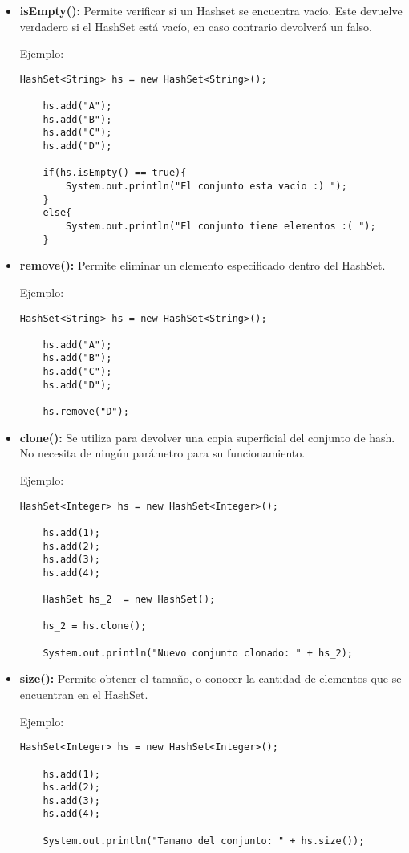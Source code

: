 \documentclass[12pt, letterpaper]{article} %
\begin{document}
\begin{itemize}
    \item \textbf{isEmpty():} Permite verificar si un Hashset se encuentra vacío. Este devuelve verdadero si el HashSet está vacío, en caso contrario devolverá un falso.

    Ejemplo:
    \lstset{language = Java, breaklines=true, basicstyle=\footnotesize}
    \begin{lstlisting}[frame=single]
    HashSet<String> hs = new HashSet<String>();

    hs.add("A");
    hs.add("B");
    hs.add("C");
    hs.add("D");

    if(hs.isEmpty() == true){
        System.out.println("El conjunto esta vacio :) ");
    }
    else{
    	System.out.println("El conjunto tiene elementos :( ");
    }
    \end{lstlisting}

    \item \textbf{remove():} Permite eliminar un elemento especificado dentro del HashSet.

    Ejemplo:
    \lstset{language = Java, breaklines=true, basicstyle=\footnotesize}
    \begin{lstlisting}[frame=single]
    HashSet<String> hs = new HashSet<String>();

    hs.add("A");
    hs.add("B");
    hs.add("C");
    hs.add("D");

    hs.remove("D");
    \end{lstlisting}

    \item \textbf{clone():} Se utiliza para devolver una copia superficial del conjunto de hash. No necesita de ningún parámetro para su funcionamiento.
   
    Ejemplo:
    \vspace{15mm}
    \lstset{language = Java, breaklines=true, basicstyle=\footnotesize}
    \begin{lstlisting}[frame=single]
    HashSet<Integer> hs = new HashSet<Integer>();

    hs.add(1);
    hs.add(2);
    hs.add(3);
    hs.add(4);

    HashSet hs_2  = new HashSet();

    hs_2 = hs.clone();

    System.out.println("Nuevo conjunto clonado: " + hs_2);
    \end{lstlisting}

    \item \textbf{size():} Permite obtener el tamaño, o conocer la cantidad de elementos que se encuentran en el HashSet.

    Ejemplo:
    \lstset{language = Java, breaklines=true, basicstyle=\footnotesize}
    \begin{lstlisting}[frame=single]
    HashSet<Integer> hs = new HashSet<Integer>();

    hs.add(1);
    hs.add(2);
    hs.add(3);
    hs.add(4);

    System.out.println("Tamano del conjunto: " + hs.size());
    \end{lstlisting}
\end{itemize}
\end{document}
